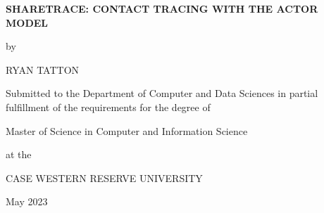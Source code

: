 \begin{titlepage}
\centering

\Large

\textbf{SHARETRACE: CONTACT TRACING WITH THE ACTOR MODEL}

\vspace{0.1in}

\large

by

\vspace{0.1in}

\Large

RYAN TATTON

\vspace{0.1in}

\large

Submitted to the Department of Computer and Data Sciences in partial
fulfillment of the requirements for the degree of

\vspace{0.1in}

Master of Science in Computer and Information Science

\vspace{0.1in}

at the

\vspace{0.1in}

CASE WESTERN RESERVE UNIVERSITY

\vspace{0.1in}

May 2023
\end{titlepage}